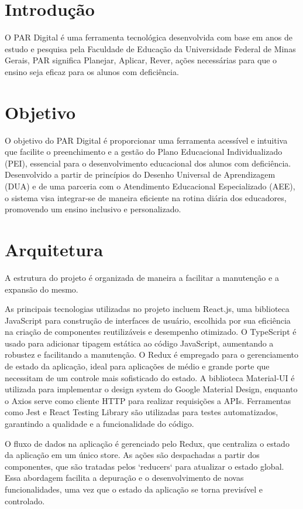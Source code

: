 \documentclass[sigconf]{webmedia}
\begin{document}
\section{Introdução}

O PAR Digital é uma ferramenta tecnológica desenvolvida com base em anos de estudo
e pesquisa pela Faculdade de Educação da Universidade Federal de Minas Gerais, PAR
significa Planejar, Aplicar, Rever, ações necessárias para que o ensino seja eficaz
para os alunos com deficiência.

\section{Objetivo}
O objetivo do PAR Digital é proporcionar uma ferramenta acessível e intuitiva
que facilite o preenchimento e a gestão do Plano Educacional Individualizado (PEI),
essencial para o desenvolvimento educacional dos alunos com deficiência. Desenvolvido
 a partir de princípios do Desenho Universal de Aprendizagem (DUA) e de uma parceria
 com o Atendimento Educacional Especializado (AEE), o sistema visa integrar-se de
 maneira eficiente na rotina diária dos educadores, promovendo um ensino inclusivo
 e personalizado.

\section{Arquitetura}

A estrutura do projeto é organizada de maneira a facilitar 
a manutenção e a expansão do mesmo.

As principais tecnologias utilizadas no projeto incluem React.js, uma biblioteca
JavaScript para construção de interfaces de usuário, escolhida por sua eficiência
na criação de componentes reutilizáveis e desempenho otimizado. O TypeScript é
usado para adicionar tipagem estática ao código JavaScript, aumentando a robustez
e facilitando a manutenção. O Redux é empregado para o gerenciamento de estado da
aplicação, ideal para aplicações de médio e grande porte que necessitam de um
controle mais sofisticado do estado. A biblioteca Material-UI é utilizada para
implementar o design system do Google Material Design, enquanto o Axios serve
como cliente HTTP para realizar requisições a APIs. Ferramentas como Jest e
React Testing Library são utilizadas para testes automatizados, garantindo a
qualidade e a funcionalidade do código.

O fluxo de dados na aplicação é gerenciado pelo Redux, que centraliza o estado da
aplicação em um único store. As ações são despachadas a partir dos componentes,
que são tratadas pelos `reducers` para atualizar o estado global. Essa abordagem
facilita a depuração e o desenvolvimento de novas funcionalidades, uma vez que o
estado da aplicação se torna previsível e controlado.
\end{document}
